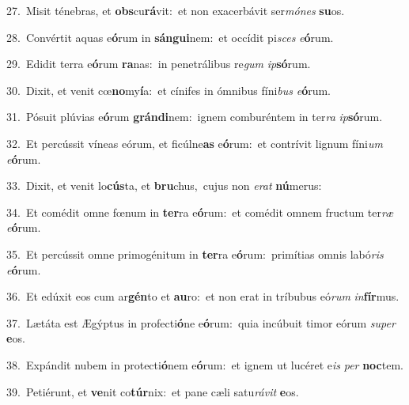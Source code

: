 {\numbfont\textcolor{\numbcolor}{27.}}~Misit ténebras, et \textbf{obs}\-cu\-\textbf{rá}\-vit:~\star et non exacerbávit ser\-\textit{mó}\-\textit{nes} \textbf{su}\-os.\par
{\numbfont\textcolor{\numbcolor}{28.}}~Convértit aquas e\-\textbf{ó}\-rum in \textbf{sán}\-\textbf{gui}nem:~\star et occídit pi\textit{sces} \textit{e}\-\textbf{ó}rum.\par
{\numbfont\textcolor{\numbcolor}{29.}}~Edidit terra e\-\textbf{ó}\-rum \textbf{ra}\-nas:~\star in penetrálibus re\textit{gum} \textit{ip}\-\textbf{só}rum.\par
{\numbfont\textcolor{\numbcolor}{30.}}~Dixit, et venit cœ\-\textbf{no}\-my\-\textbf{í}\-a:~\star et cínifes in ómnibus fíni\textit{bus} \textit{e}\-\textbf{ó}rum.\par
{\numbfont\textcolor{\numbcolor}{31.}}~Pósuit plúvias e\-\textbf{ó}\-rum \textbf{grán}\-\textbf{di}nem:~\star ignem comburéntem in ter\textit{ra} \textit{ip}\-\textbf{só}rum.\par
{\numbfont\textcolor{\numbcolor}{32.}}~Et percússit víneas eórum, et ficúlne\textbf{as} e\-\textbf{ó}\-rum:~\star et contrívit lignum fíni\textit{um} \textit{e}\-\textbf{ó}rum.\par
{\numbfont\textcolor{\numbcolor}{33.}}~Dixit, et venit lo\-\textbf{cús}\-ta, et \textbf{bru}\-chus,~\star cujus non \textit{e}\-\textit{rat} \textbf{nú}\-merus:\par
{\numbfont\textcolor{\numbcolor}{34.}}~Et comédit omne fœnum in \textbf{ter}\-ra e\-\textbf{ó}\-rum:~\star et comédit omnem fructum ter\textit{ræ} \textit{e}\-\textbf{ó}rum.\par
{\numbfont\textcolor{\numbcolor}{35.}}~Et percússit omne primogénitum in \textbf{ter}\-ra e\-\textbf{ó}\-rum:~\star primítias omnis labó\textit{ris} \textit{e}\-\textbf{ó}rum.\par
{\numbfont\textcolor{\numbcolor}{36.}}~Et edúxit eos cum ar\-\textbf{gén}\-to et \textbf{au}\-ro:~\star et non erat in tríbubus eó\textit{rum} \textit{in}\-\textbf{fír}mus.\par
{\numbfont\textcolor{\numbcolor}{37.}}~Lætáta est Ægýptus in profecti\-\textbf{ó}\-ne e\-\textbf{ó}\-rum:~\star quia incúbuit timor eórum \textit{su}\-\textit{per} \textbf{e}\-os.\par
{\numbfont\textcolor{\numbcolor}{38.}}~Expándit nubem in protecti\-\textbf{ó}\-nem e\-\textbf{ó}\-rum:~\star et ignem ut lucéret e\textit{is} \textit{per} \textbf{noc}\-tem.\par
{\numbfont\textcolor{\numbcolor}{39.}}~Petiérunt, et \textbf{ve}\-nit co\-\textbf{túr}\-nix:~\star et pane cæli satu\-\textit{rá}\-\textit{vit} \textbf{e}\-os.\par
